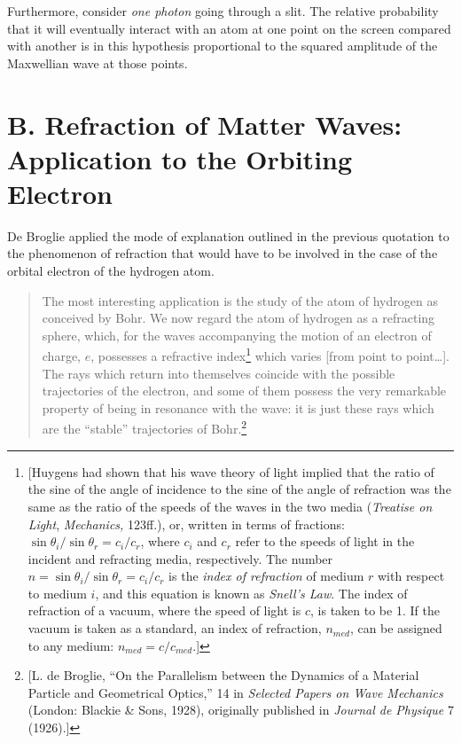 Furthermore, consider \emph{one photon} going through a slit. The
relative probability that it will eventually interact with an atom at
one point on the screen compared with another is in this hypothesis
proportional to the squared amplitude of the Maxwellian wave at those
points.

\section*{B. Refraction of Matter Waves: Application to the Orbiting
Electron }

De Broglie applied the mode of explanation outlined in the previous
quotation to the phenomenon of refraction that would have to be involved
in the case of the orbital electron of the hydrogen atom.

\begin{quote}
The most interesting application is the study of the atom of hydrogen as
conceived by Bohr. We now regard the atom of hydrogen as a refracting
sphere, which, for the waves accompanying the motion of an electron of
charge, $e$, possesses a refractive index\footnote{{[}Huygens had
  shown that his wave theory of light implied that the ratio of the sine
  of the angle of incidence to the sine of the angle of refraction was
  the same as the ratio of the speeds of the waves in the two media
  (\emph{Treatise on Light}, \emph{Mechanics,} 123ff.), or,
  written in terms of fractions: $\sin\theta_i/\sin\theta_r = c_i/c_r$, where
  $c_i$ and $c_r$ refer to the
  speeds of light in the incident and refracting media, respectively.
  The number $n = \sin\theta_i/\sin\theta_r = c_i/c_r$ is the \emph{index
  of refraction} of medium $r$ with respect to medium $i$, and this equation
  is known as \emph{Snell's Law}. The index of refraction of a vacuum,
  where the speed of light is $c$, is taken to be 1. If the vacuum
  is taken as a standard, an index of refraction,
  $n_{med}$, can be assigned to any medium:
  $n_{med} = c/c_{med}$.{]}}
which varies {[}from point to point\ldots]. The rays which return into
themselves coincide with the possible trajectories of the electron, and
some of them possess the very remarkable property of being in resonance
with the wave: it is just these rays which are the ``stable''
trajectories of Bohr.\footnote{{[}L. de Broglie, ``On the Parallelism
  between the Dynamics of a Material Particle and Geometrical Optics,''
  14 in \emph{Selected Papers on Wave Mechanics} (London: Blackie \&
  Sons, 1928), originally published in \emph{Journal de Physique} 7
  (1926).{]}}
\end{quote}

